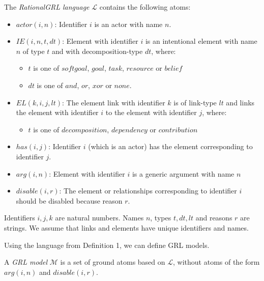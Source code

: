 \begin{definition}
The \emph{RationalGRL language} $\mathcal{L}$ contains the following atoms:
\begin{itemize}
\item $actor(i,n)$: Identifier $i$ is an actor with name $n$.
\item $IE(i,n,t,dt)$: Element with identifier $i$ is an intentional element with name $n$ of type $t$ and with decomposition-type $dt$, where: 
\begin{itemize}
\item $t$ is one of $softgoal$, $goal$, $task$, $resource$ or $belief$
\item $dt$ is one of $and$, $or$, $xor$ or $none$.
\end{itemize}
\item $EL(k,i,j,lt)$: The element link with identifier $k$ is of link-type $lt$ and links the element with identifier $i$ to the element with identifier $j$, where:
\begin{itemize}
\item $t$ is one of $decomposition$, $dependency$ or $contribution$
\end{itemize}
\item $has(i,j)$: Identifier $i$ (which is an actor) has the element corresponding to identifier $j$.
\item $arg(i,n)$: Element with identifier $i$ is a generic argument with name $n$
\item $disable(i,r)$: The element or relationships corresponding to identifier $i$ should be disabled because reason $r$.
\end{itemize}

\noindent Identifiers $i,j,k$ are natural numbers. Names $n$, types $t, dt, lt$ and reasons $r$ are strings. We assume that links and elements have unique identifiers and names. 
\end{definition}


Using the language from Definition 1, we can define GRL models.

\begin{definition} \label{def:rationaGRLmodel}
A \emph{GRL model} $\mathcal{M}$ is a set of ground atoms based on $\mathcal{L}$, without atoms of the form $arg(i,n)$ and $disable(i,r)$.
\end{definition}

